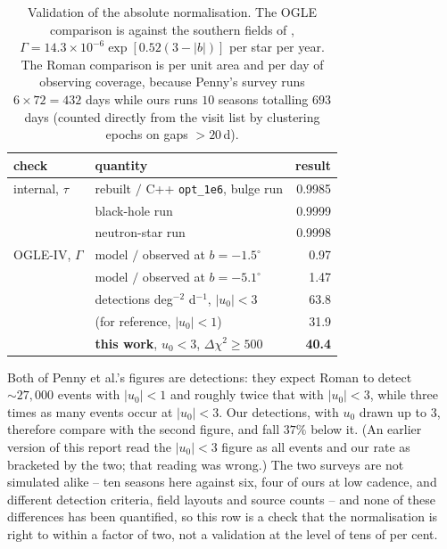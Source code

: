 \documentclass[english,10pt,a4paper]{article}
\begin{document}
\begin{table}[h]
\centering
\caption{Validation of the absolute normalisation. The OGLE comparison is against the southern
fields of \citet{Mroz2019}, $\Gamma = 14.3\times10^{-6}\exp[0.52(3-|b|)]$ per star per year.
The Roman comparison is per unit area and per day of observing coverage, because Penny's survey
runs $6\times72 = 432$ days while ours runs $10$ seasons totalling $693$ days (counted directly
from the visit list by clustering epochs on gaps $>20$\,d).}
\label{tab:yieldcheck}
\begin{tabular}{llr}
\toprule
check & quantity & result \\
\midrule
internal, $\tau$   & rebuilt $/$ C++ \texttt{opt\_1e6}, bulge run & 0.9985 \\
                   & \quad black-hole run                        & 0.9999 \\
                   & \quad neutron-star run                      & 0.9998 \\
\midrule
OGLE-IV, $\Gamma$  & model $/$ observed at $b = -1.5^\circ$      & 0.97 \\
                   & model $/$ observed at $b = -5.1^\circ$      & 1.47 \\
\midrule
\citet{Penny2019} & detections deg$^{-2}$ d$^{-1}$, $|u_0|<3$   & 63.8 \\
                   & \quad (for reference, $|u_0|<1$)             & 31.9 \\
                   & \textbf{this work}, $u_0<3$, $\Delta\chi^2\ge500$ & \textbf{40.4} \\
\bottomrule
\end{tabular}
\end{table}

Both of Penny et al.'s figures are detections: they expect Roman to detect $\sim\!27{,}000$ events
with $|u_0|<1$ and roughly twice that with $|u_0|<3$, while three times as many events occur at
$|u_0|<3$. Our detections, with $u_0$ drawn up to $3$, therefore compare with the second figure,
and fall $37\%$ below it. (An earlier version of this report read the $|u_0|<3$ figure as all
events and our rate as bracketed by the two; that reading was wrong.) The two surveys are not
simulated alike -- ten seasons here against six, four of ours at low cadence, and different
detection criteria, field layouts and source counts -- and none of these differences has been
quantified, so this row is a check that the normalisation is right to within a factor of two,
not a validation at the level of tens of per cent.
\end{document}
